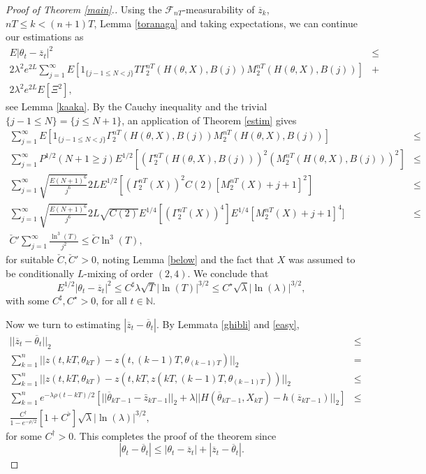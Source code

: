 \documentclass[a4paper,draft]{article}
\begin{document}
\begin{proof}[Proof of Theorem \ref{main}.]
Using the $\mathcal{F}_{nT}$-measurability of $\overline{z}_k$,
$nT\leq k<(n+1)T$, Lemma \ref{toranaga} and taking expectations, we can continue our estimations as
\begin{eqnarray*}
E| \theta_{t}-\overline{z}_{t}|^2 &\leq&\\
2\lambda^2 e^{2L}\sum_{j=1}^{\infty}E[1_{\{j-1\leq N <j\}}
T\Gamma_2^{nT}(H(\theta,X),B(j))M_2^{nT}(H(\theta,X),B(j))] &+&\\
2\lambda^2 e^{2L}
E\left[\Xi^2\right],
\end{eqnarray*}
see Lemma \ref{kaaka}.
By the Cauchy inequality and the trivial $\{j-1\leq N\}=\{j\leq N+1\}$,
an application of Theorem \ref{estim} gives
\begin{eqnarray*}
\sum_{j=1}^{\infty}E[1_{\{j-1\leq N <j\}}
\Gamma_2^{nT}(H(\theta,X),B(j))M_2^{nT}(H(\theta,X),B(j))] &\leq&\\
\sum_{j=1}^{\infty} P^{1/2}(N+1\geq j)
E^{1/2}[(\Gamma_2^{nT}(H(\theta,X),B(j)))^2(M_2^{nT}(H(\theta,X),B(j)))^2] &\leq&\\
\sum_{j=1}^{\infty}\sqrt{\frac{E(N+1)^6}{j^6}}2LE^{1/2}[(\Gamma^{nT}_2(X))^2 C(2)[M_2^{nT}(X)+j+1]^2] &\leq&\\
\sum_{j=1}^{\infty}\sqrt{\frac{E(N+1)^6}{j^6}}2L\sqrt{C(2)}
E^{1/4}[(\Gamma^{nT}_2(X))^4]
E^{1/4}[M_2^{nT}(X)+j+1]^4] &\leq&\\
\check{C}'\sum_{j=1}^{\infty} \frac{\ln^3(T)}{j^2}
\leq \check{C}\ln^3(T), & &
\end{eqnarray*}
for suitable $\check{C}, \check{C}'>0$, noting Lemma \ref{below}
and the fact that $X$ was assumed
to be conditionally $L$-mixing of order $(2,4)$. We conclude that
$$
E^{1/2}| \theta_{t}-\overline{z}_{t}|^2\leq C^{\sharp}\lambda \sqrt{T}
|\ln(T)|^{3/2}\leq C^{\star}\sqrt{\lambda}|\ln(\lambda)|^{3/2},
$$
with some $C^{\sharp},C^{\star}>0$, for all $t\in\mathbb{N}$.

Now we turn to
estimating $|\overline{z}_t-\overline{\theta}_t|$. By Lemmata \ref{ghibli}
and \ref{easy},
\begin{eqnarray*}
||\overline{z}_t-\overline{\theta}_t||_2 &\leq &\\
\sum_{k=1}^n ||z(t,kT,\theta_{kT}) - z(t, (k-1)T, \theta_{(k-1)T})||_2 &=& \\
\sum_{k=1}^n ||z(t,kT,\theta_{kT}) - z(t, kT, z(kT,(k-1)T, \theta_{(k-1)T}))||_2
&\leq &\\
\sum_{k = 1}^{n} e^{-\lambda\rho(t-kT)/2}
\left[||\overline{\theta}_{kT -1} - \bar{z}_{kT-1}||_2 +
\lambda ||H(\overline{\theta}_{kT-1},X_{kT}) - h(\overline{z}_{kT-1})||_2\right]
&\leq &\\
\frac{C^{\dagger}}{1-e^{-\rho/2}}\left[1+C^{\flat}\right]\sqrt{\lambda}
|\ln(\lambda)|^{3/2},
\end{eqnarray*}
for some $C^{\dagger}>0$.
This completes the proof of the theorem since
$$
|\theta_t-\overline{\theta}_t|\leq |{\theta}_t-\overline{z}_t|+
|\overline{z}_t-\overline{\theta}_t|.
$$
\end{proof}
\end{document}
